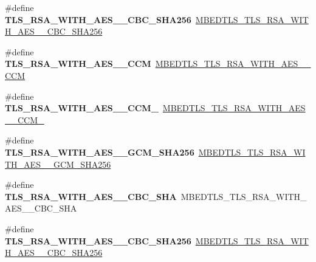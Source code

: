 \begin{DoxyCompactItemize}
\item 
\mbox{\label{compat-1_83_8h_a54355abc9101b3aa02477e02f76b46bd}} 
\#define {\bfseries T\+L\+S\+\_\+\+R\+S\+A\+\_\+\+W\+I\+T\+H\+\_\+\+A\+E\+S\+\_\+\_\+\+C\+B\+C\+\_\+\+S\+H\+A256}~\mbox{\hyperlink{ssl__ciphersuites_8h_aaa6755f627cc0ad90c7602f0682c6e43}{M\+B\+E\+D\+T\+L\+S\+\_\+\+T\+L\+S\+\_\+\+R\+S\+A\+\_\+\+W\+I\+T\+H\+\_\+\+A\+E\+S\+\_\+\_\+\+C\+B\+C\+\_\+\+S\+H\+A256}}
\item 
\mbox{\label{compat-1_83_8h_a0bc31dea187e19a84ea02749de509a63}} 
\#define {\bfseries T\+L\+S\+\_\+\+R\+S\+A\+\_\+\+W\+I\+T\+H\+\_\+\+A\+E\+S\+\_\+\_\+\+C\+CM}~\mbox{\hyperlink{ssl__ciphersuites_8h_afb03032287daab618e63d7546c8b0b82}{M\+B\+E\+D\+T\+L\+S\+\_\+\+T\+L\+S\+\_\+\+R\+S\+A\+\_\+\+W\+I\+T\+H\+\_\+\+A\+E\+S\+\_\+\_\+\+C\+CM}}
\item 
\mbox{\label{compat-1_83_8h_a565e29a90172e7eb87bc09db33485ea9}} 
\#define {\bfseries T\+L\+S\+\_\+\+R\+S\+A\+\_\+\+W\+I\+T\+H\+\_\+\+A\+E\+S\+\_\+\_\+\+C\+C\+M\+\_}~\mbox{\hyperlink{ssl__ciphersuites_8h_aa68e1dc44eea702c14a84b25897ec1ad}{M\+B\+E\+D\+T\+L\+S\+\_\+\+T\+L\+S\+\_\+\+R\+S\+A\+\_\+\+W\+I\+T\+H\+\_\+\+A\+E\+S\+\_\+\_\+\+C\+C\+M\+\_}}
\item 
\mbox{\label{compat-1_83_8h_a47cae4f1051ae290a4706ed1107c6606}} 
\#define {\bfseries T\+L\+S\+\_\+\+R\+S\+A\+\_\+\+W\+I\+T\+H\+\_\+\+A\+E\+S\+\_\+\_\+\+G\+C\+M\+\_\+\+S\+H\+A256}~\mbox{\hyperlink{ssl__ciphersuites_8h_a1dd099744ffe76417ecc84a7979ef45f}{M\+B\+E\+D\+T\+L\+S\+\_\+\+T\+L\+S\+\_\+\+R\+S\+A\+\_\+\+W\+I\+T\+H\+\_\+\+A\+E\+S\+\_\+\_\+\+G\+C\+M\+\_\+\+S\+H\+A256}}
\item 
\mbox{\label{compat-1_83_8h_a30ca15463d73a648cb95ea79e64606e3}} 
\#define {\bfseries T\+L\+S\+\_\+\+R\+S\+A\+\_\+\+W\+I\+T\+H\+\_\+\+A\+E\+S\+\_\+\_\+\+C\+B\+C\+\_\+\+S\+HA}~M\+B\+E\+D\+T\+L\+S\+\_\+\+T\+L\+S\+\_\+\+R\+S\+A\+\_\+\+W\+I\+T\+H\+\_\+\+A\+E\+S\+\_\+\_\+\+C\+B\+C\+\_\+\+S\+HA
\item 
\mbox{\label{compat-1_83_8h_a049cb14aa5985691cbcf3e9414141878}} 
\#define {\bfseries T\+L\+S\+\_\+\+R\+S\+A\+\_\+\+W\+I\+T\+H\+\_\+\+A\+E\+S\+\_\+\_\+\+C\+B\+C\+\_\+\+S\+H\+A256}~\mbox{\hyperlink{ssl__ciphersuites_8h_a542c73000e3c2962855a4c62f85e9533}{M\+B\+E\+D\+T\+L\+S\+\_\+\+T\+L\+S\+\_\+\+R\+S\+A\+\_\+\+W\+I\+T\+H\+\_\+\+A\+E\+S\+\_\+\_\+\+C\+B\+C\+\_\+\+S\+H\+A256}}

\end{DoxyCompactItemize}
